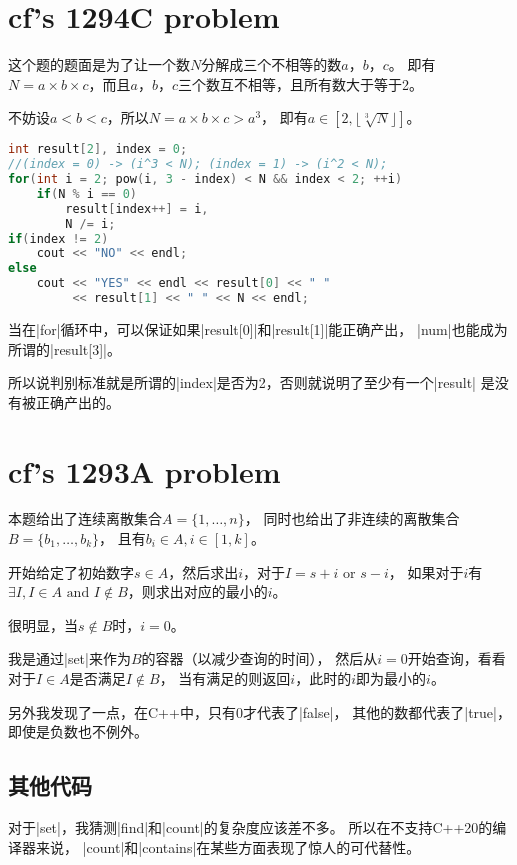 \section{cf's 1294C problem}

这个题的题面是为了让一个数$N$分解成三个不相等的数$a$，$b$，$c$。
即有$N=a\times b\times c$，而且$a$，$b$，$c$三个数互不相等，且所有数大于等于2。

不妨设$a < b < c$，所以$N=a\times b\times c>a^3$，
即有$a\in[2,\lfloor\sqrt[3]{N}\rfloor]$。

\begin{lstlisting}[language=C++]
int result[2], index = 0;
//(index = 0) -> (i^3 < N); (index = 1) -> (i^2 < N);
for(int i = 2; pow(i, 3 - index) < N && index < 2; ++i)
    if(N % i == 0)
        result[index++] = i,
        N /= i;
if(index != 2)
    cout << "NO" << endl;
else
    cout << "YES" << endl << result[0] << " "
         << result[1] << " " << N << endl;
\end{lstlisting}

当在\vb|for|循环中，可以保证如果\vb|result[0]|和\vb|result[1]|能正确产出，
\vb|num|也能成为所谓的\vb|result[3]|。

所以说判别标准就是所谓的\vb|index|是否为2，否则就说明了至少有一个\vb|result|
是没有被正确产出的。


\section{cf's 1293A problem}

本题给出了连续离散集合$A=\{1, \ldots, n\}$，
同时也给出了非连续的离散集合$B=\{b_1, \ldots, b_k\}$，
且有$b_i\in A, i\in [1, k]$。

开始给定了初始数字$s\in A$，然后求出$i$，对于$I=s+i\text{ or }s-i$，
如果对于$i$有$\exists I, I\in A\text{ and } I\notin B$，则求出对应的最小的$i$。

很明显，当$s\notin B$时，$i=0$。

我是通过\vb|set|来作为$B$的容器（以减少查询的时间），
然后从$i = 0$开始查询，看看对于$I\in A$是否满足$I\notin B$，
当有满足的则返回$i$，此时的$i$即为最小的$i$。

另外我发现了一点，在C++中，只有0才代表了\vb|false|，
其他的数都代表了\vb|true|，即使是负数也不例外。

\subsection{其他代码}
对于\vb|set|，我猜测\vb|find|和\vb|count|的复杂度应该差不多。
所以在不支持C++20的编译器来说，
\vb|count|和\vb|contains|在某些方面表现了惊人的可代替性。


